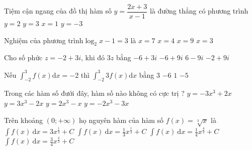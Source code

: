 \begin{ex} %
Tiệm cận ngang của đồ thị hàm số $y=\dfrac{2x+3}{x-1} $ là đường thẳng có phương trình
\choice
{\True $y=2$}
{$y=3$}
{$x=1$}
{$y=-3$}
\end{ex}

\begin{ex} %
Nghiệm của phương trình$ \log_2{x-1}=3$ là
\choice
{$x=7$}
{$x=4$}
{\True$x=9$}
{$x=3$}
\end{ex}

\begin{ex} %
\end{ex}

\begin{ex} %
Cho số phức $z=-2+3 i$, khi đó $3 z$ bằng 
\choice
{$-6+3i$}
{\True $-6+9i$}
{$6-9i$}
{$-2+9i$}
\end{ex}

\begin{ex} %
Nếu $\int_{-2}^{3} f(x) \mathrm{d} x=-2$  thì $\int_{-2}^{3} 3 f(x) \mathrm{d} x$ bằng 
\choice
{$3$}
{\True$-6$}
{$1$}
{$-5$}
\end{ex}

\begin{ex} %
Trong các hàm số đưới đây, hàm số nào không có cực trị ?
\choice
{$y=-3 x^{3}+2 x$}
{$y=3 x^{3}-2 x$}
{$y=2 x^{3}-x$}
{\True$y=-2 x^{3}-3 x$}
\end{ex}

\begin{ex} %
Trên khoảng $(0 ;+\infty)$ họ nguyên hàm của hàm số $f(x)=\sqrt[3]{x}$ là
\choice
{$\int f(x) ~\mathrm{d} x=3 x^{\frac{1}{3}}+C$}
{$\int f(x) ~\mathrm{d} x=\frac{1}{3} x^{\frac{1}{3}}+C$}
{$\int f(x) ~\mathrm{d} x=\frac{1}{4} x^{\frac{4}{3}}+C$}
{\True$\int f(x) ~\mathrm{d} x=\frac{3}{4} x^{\frac{4}{3}}+C$}
\end{ex}

